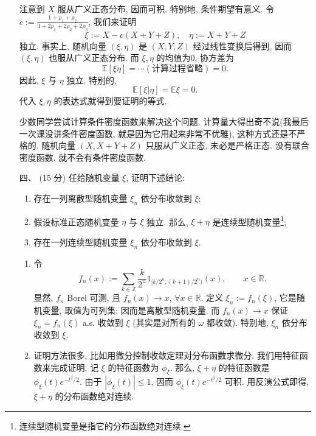 \begin{enumerate}
\begin{proofc}
    注意到 $X$ 服从广义正态分布, 因而可积. 特别地, 条件期望有意义. 
    令 $c:=\frac{1+\rho_{1}+\rho_{2}}{3+2 \rho_{1}+2 \rho_{2}+2 \rho_{3}}$, 我们来证明
\[
\xi:=X-c(X+Y+Z), \quad \eta:=X+Y+Z
\]
独立. 事实上, 随机向量 $(\xi, \eta)$ 是 $(X, Y, Z)$ 经过线性变换后得到, 
因而 $(\xi, \eta)$ 也服从广义正态分布. 而 $\xi, \eta$ 的均值为$0$, 协方差为
\[
\mathbb{E}[\xi \eta]=\cdots (计算过程省略) =0.
\]
因此, $\xi$ 与 $\eta$ 独立. 特别的,
\[
\mathbb{E}[\xi | \eta]=\mathbb{E} \xi=0 .
\]
代入 $\xi, \eta$ 的表达式就得到要证明的等式.

少数同学尝试计算条件密度函数来解决这个问题. 
计算量大得出奇不说(我最后一次课没讲条件密度函数, 就是因为它用起来非常不优雅), 
这种方式还是不严格的. 随机向量 $(X, X+Y+Z)$ 只服从广义正态, 未必是严格正态. 
没有联合密度函数, 就不会有条件密度函数.
\end{proofc}

\item[四、](15 分)
任给随机变量 $\xi$, 证明下述结论:
\begin{enumerate}[label=(\arabic*)]
\item 存在一列离散型随机变量 $\xi_{n}$ 依分布收敛到 $\xi$;
\item 假设标准正态随机变量 $\eta$ 与 $\xi$ 独立. 那么, $\xi+\eta$ 是连续型随机变量\footnote{连续型随机变量是指它的分布函数绝对连续.};
\item 存在一列连续型随机变量 $\xi_{n}$ 依分布收敛到 $\xi$.
\end{enumerate}

\begin{proofc}
    \begin{enumerate}[label=(\arabic*)]
\item 令 \[f_{n}(x):=\sum_{k \in \mathbb{Z}} \frac{k}{2^{n}} 1_{[k / 2^{n},(k+1) / 2^{n})}(x), \qquad x \in \mathbb{R}.\] 
显然, $f_{n}$ Borel 可测, 且 $f_{n}(x) \to x$, $\forall x \in \mathbb{R}$. 
定义 $\xi_{n}:=f_{n}(\xi)$, 它是随机变量, 取值为可列集; 因而是离散型随机变量. 
而 $f_{n}(x) \to x$ 保证 $\xi_{n}=f_{n}(\xi)$ a.s. 收敛到 $\xi$ (其实是对所有的 $\omega$ 都收敛). 特别地, $\xi_{n}$ 依分布收敛到 $\xi$.

\item 证明方法很多, 比如用微分控制收敛定理对分布函数求微分. 
我们用特征函数来完成证明. 记 $\xi$ 的特征函数为 $\phi_{\xi}$. 
那么, $\xi+\eta$ 的特征函数是 $\phi_{\xi}(t) e^{-t^{2} / 2}$. 
由于 $|\phi_{\xi}(t)| \leq 1$, 因而 $\phi_{\xi}(t) e^{-t^{2} / 2}$ 可积. 
用反演公式即得, $\xi+\eta$ 的分布函数绝对连续.


\end{enumerate}
\end{proofc}
\end{enumerate}
